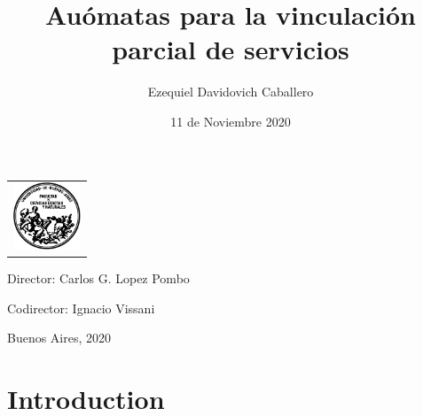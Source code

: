 \documentclass[10pt,xcolor={table,dvipsnames},t]{beamer}
\title{Auómatas para la vinculación parcial de servicios}
\author{Ezequiel Davidovich Caballero}
\institute{Departamento de Computación, Facultad de Ciencias Exactas y Naturales}
\date{11 de Noviembre 2020}
\begin{document}
\begin{frame}
\vspace{-2cm}
\begin{center}
\begin{tabular}{l}
\includegraphics[width=2cm]{logofcen.pdf}
\end{tabular}    
\end{center}

  \titlepage
  
  {

{Director: Carlos G. Lopez Pombo}

\vspace{.2cm}

{Codirector: Ignacio Vissani}

\vspace{.2cm}

Buenos Aires, 2020
}
\end{frame}


\section{Introduction}
\end{document}
